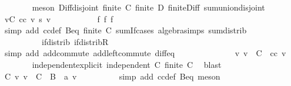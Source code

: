 \begin{isabellebody}
\ \ \ \ \ \ \isamarkupfalse%
\ {\isacharparenleft}{\kern0pt}meson\ Diff{\isacharunderscore}{\kern0pt}disjoint\ {\isacartoucheopen}finite\ C{\isacartoucheclose}\ {\isacartoucheopen}finite\ D{\isacartoucheclose}\ finite{\isacharunderscore}{\kern0pt}Diff\ sum{\isachardot}{\kern0pt}union{\isacharunderscore}{\kern0pt}disjoint{\isacharparenright}{\kern0pt}\isanewline
\ \ \ \ \isamarkupfalse%
\ {\isachardoublequoteopen}{\isacharparenleft}{\kern0pt}{\isasymSum}v{\isasymin}C{\isachardot}{\kern0pt}\ cc\ v\ {\isacharasterisk}{\kern0pt}s\ v{\isacharparenright}{\kern0pt}\ {\isacharequal}{\kern0pt}\ {}{\isachardoublequoteclose}\isanewline
\ \ \ \ \ \ \isamarkupfalse%
\ {}\ f{}\ f{}\ f{}\isanewline
\ \ \ \ \ \ \isamarkupfalse%
\ {\isacharparenleft}{\kern0pt}simp\ add{\isacharcolon}{\kern0pt}\ cc{\isacharunderscore}{\kern0pt}def\ Beq\ {\isacartoucheopen}finite\ C{\isacartoucheclose}\ sum{\isachardot}{\kern0pt}If{\isacharunderscore}{\kern0pt}cases\ algebra{\isacharunderscore}{\kern0pt}simps\ sum{\isachardot}{\kern0pt}distrib\isanewline
\ \ \ \ \ \ \ \ \ \ if{\isacharunderscore}{\kern0pt}distrib\ if{\isacharunderscore}{\kern0pt}distribR{\isacharparenright}{\kern0pt}\isanewline
\ \ \ \ \ \ \isamarkupfalse%
\ {\isacharparenleft}{\kern0pt}simp\ add{\isacharcolon}{\kern0pt}\ add{\isachardot}{\kern0pt}commute\ add{\isachardot}{\kern0pt}left{\isacharunderscore}{\kern0pt}commute\ diff{\isacharunderscore}{\kern0pt}eq{\isacharparenright}{\kern0pt}\isanewline
\ \ \ \ \ \ \isamarkupfalse%
\isanewline
\ \ \ \ \isamarkupfalse%
\ \isamarkupfalse%
\ {\isachardoublequoteopen}{\isasymAnd}v{\isachardot}{\kern0pt}\ v\ {\isasymin}\ C\ {\isasymLongrightarrow}\ cc\ v\ {\isacharequal}{\kern0pt}\ {}{\isachardoublequoteclose}\isanewline
\ \ \ \ \ \ \isamarkupfalse%
\ independent{\isacharunderscore}{\kern0pt}explicit\ {\isacartoucheopen}independent\ C{\isacartoucheclose}\ {\isacartoucheopen}finite\ C{\isacartoucheclose}\ \isamarkupfalse%
\ blast\isanewline
\ \ \ \ \isamarkupfalse%
\ \isamarkupfalse%
\ C{}{\isacharcolon}{\kern0pt}\ {\isachardoublequoteopen}{\isasymAnd}v{\isachardot}{\kern0pt}\ v\ {\isasymin}\ C\ {\isacharminus}{\kern0pt}\ B\ {\isasymLongrightarrow}\ a\ v\ {\isacharequal}{\kern0pt}\ {}{\isachardoublequoteclose}\isanewline
\ \ \ \ \ \ \isamarkupfalse%
\ {\isacharparenleft}{\kern0pt}simp\ add{\isacharcolon}{\kern0pt}\ cc{\isacharunderscore}{\kern0pt}def\ Beq{\isacharparenright}{\kern0pt}\ meson\isanewline

\end{isabellebody}
